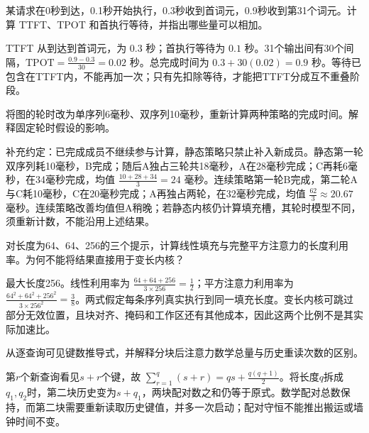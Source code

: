 
\begin{exercises}
\begin{exercise} 某请求在0秒到达，0.1秒开始执行，0.3秒收到首词元，0.9秒收到第31个词元。计算 TTFT、TPOT 和首执行等待，并指出哪些量可以相加。

\begin{solution}
TTFT 从到达到首词元，为 $0.3$ 秒；首执行等待为 $0.1$ 秒。31个输出间有30个间隔，$\mathrm{TPOT}=\frac{0.9-0.3}{30}=0.02$ 秒。总完成时间为 $0.3+30(0.02)=0.9$ 秒。等待已包含在TTFT内，不能再加一次；只有先扣除等待，才能把TTFT分成互不重叠阶段。
\end{solution}
\end{exercise}

\begin{exercise} 将图的轮时改为单序列6毫秒、双序列10毫秒，重新计算两种策略的完成时间。解释固定轮时假设的影响。

\begin{solution}
补充约定：已完成成员不继续参与计算，静态策略只禁止补入新成员。静态第一轮双序列耗10毫秒，B完成；随后A独占三轮共18毫秒，A在28毫秒完成；C再耗6毫秒，在34毫秒完成，均值 $\frac{10+28+34}{3}=24$ 毫秒。连续策略第一轮B完成，第二轮A与C耗10毫秒，C在20毫秒完成；A再独占两轮，在32毫秒完成，均值 $\frac{62}{3}\approx20.67$ 毫秒。连续策略改善均值但A稍晚；若静态内核仍计算填充槽，其轮时模型不同，须重新计数，不能沿用上述结果。
\end{solution}
\end{exercise}

\begin{exercise} 对长度为64、64、256的三个提示，计算线性填充与完整平方注意力的长度利用率。为何不能将结果直接用于变长内核？

\begin{solution}
最大长度256。线性利用率为 $\frac{64+64+256}{3\times256}=\frac{1}{2}$；平方注意力利用率为 $\frac{64^2+64^2+256^2}{3\times256^2}=\frac{3}{8}$。两式假定每条序列真实执行到同一填充长度。变长内核可跳过部分无效位置，且块对齐、掩码和工作区还有其他成本，因此这两个比例不是其实际加速比。
\end{solution}
\end{exercise}

\begin{exercise} 从逐查询可见键数推导式，并解释分块后注意力数学总量与历史重读次数的区别。

\begin{solution}
第$r$个新查询看见$s+r$个键，故 $\sum_{r=1}^q(s+r)=qs+\frac{q(q+1)}{2}$。将长度$q$拆成$q_1,q_2$时，第二块历史变为$s+q_1$，两块配对数之和仍等于原式。数学配对总数保持，而第二块需要重新读取历史键值，并多一次启动；配对守恒不能推出搬运或墙钟时间不变。
\end{solution}
\end{exercise}


\end{exercises}
